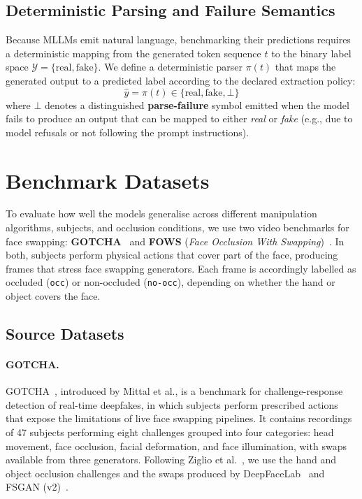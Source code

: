 \subsection{Deterministic Parsing and Failure Semantics}

Because MLLMs emit natural language, benchmarking their predictions requires a deterministic mapping from the generated token sequence $t$ to the binary label space $\mathcal{Y} = \{\text{real}, \text{fake}\}$. We define a deterministic parser $\pi(t)$ that maps the generated output to a predicted label according to the declared extraction policy:
\begin{equation}
    \hat{y} = \pi(t) \in \{\text{real}, \text{fake}, \bot\}
\end{equation}
where $\bot$ denotes a distinguished \textbf{parse-failure} symbol emitted when the model fails to produce an output that can be mapped to either \emph{real} or \emph{fake} (e.g., due to model refusals or not following the prompt instructions).

\section{Benchmark Datasets}
\label{sec:datasets}

To evaluate how well the models generalise across different manipulation algorithms, subjects, and occlusion conditions, we use two video benchmarks for face swapping: \textbf{GOTCHA}~\cite{gotcha} and \textbf{FOWS} (\emph{Face Occlusion With Swapping})~\cite{fows}. In both, subjects perform physical actions that cover part of the face, producing frames that stress face swapping generators. Each frame is accordingly labelled as occluded (\texttt{occ}) or non-occluded (\texttt{no-occ}), depending on whether the hand or object covers the face.

\subsection{Source Datasets}

\paragraph{GOTCHA.}
GOTCHA~\cite{gotcha}, introduced by Mittal et al., is a benchmark for challenge-response detection of real-time deepfakes, in which subjects perform prescribed actions that expose the limitations of live face swapping pipelines. It contains recordings of 47 subjects performing eight challenges grouped into four categories: head movement, face occlusion, facial deformation, and face illumination, with swaps available from three generators. Following Ziglio et al.~\cite{fows}, we use the hand and object occlusion challenges and the swaps produced by DeepFaceLab~\cite{deepfacelab} and FSGAN (v2)~\cite{fsgan}.

